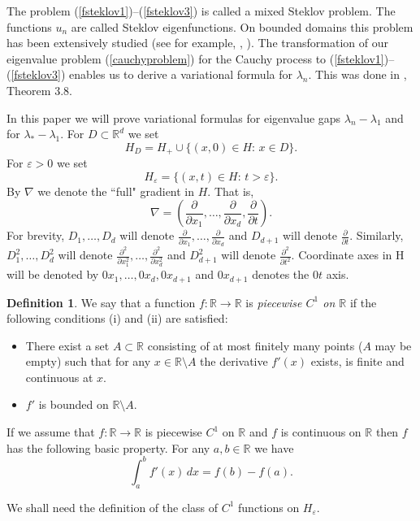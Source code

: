 \documentclass[11pt,leqno]{article}
\theoremstyle{definition}
\newtheorem{defn}{Definition}[section]
\newcommand{\Rd}{\mathbb{R}^d}
\newcommand{\R}{\mathbb{R}}
\newcommand{\eps}{\varepsilon}
\numberwithin{equation}{section}
\begin{document}
The problem (\ref{fsteklov1})--(\ref{fsteklov3}) is called a mixed Steklov problem. The
functions $u_n$ are
called Steklov eigenfunctions. On bounded domains this problem has been 
extensively studied  (see for example,  \cite{HP}, \cite{DS}).
The transformation of our eigenvalue problem (\ref{cauchyproblem}) 
for the Cauchy process to
(\ref{fsteklov1})--(\ref{fsteklov3}) enables us to 
derive a variational formula for
$\lambda_{n}$. This was done in \cite{BK}, Theorem 3.8. 

In this paper we will prove variational formulas for eigenvalue
 gaps $\lambda_n - \lambda_1$
 and for $\lambda_* - \lambda_1$. 
 For $D \subset \Rd$ we set 
$$
H_D = H_+ \cup \{(x,0) \in H: \, x \in D\}.
$$
For $\eps > 0$ we set
$$
H_{\eps} = \{(x,t) \in H: \, t > \eps\}.
$$
By  $\nabla$ we denote the ``full" gradient in $H$.  That is,
$$
\nabla = \left(\frac{\partial}{\partial x_{1}}, \ldots, \frac{\partial}{\partial 
x_{d}}, \frac{\partial}{\partial t} \right).
$$
For brevity, $D_1, \ldots, D_d$ will denote $\frac{\partial}{\partial x_1}, \ldots, \frac{\partial}{\partial x_d}$
and $D_{d+1}$ will denote $\frac{\partial}{\partial t}$. Similarly, $D_1^2, \ldots, D_d^2$ will denote
$\frac{\partial^2}{\partial x_1^2}, \ldots, \frac{\partial^2}{\partial x_d^2}$ and $D_{d+1}^2$ will denote
$\frac{\partial^2}{\partial t^2}$. Coordinate axes in H will be denoted by $0x_1, \ldots, 0x_d, 0x_{d + 1}$ and 
$0x_{d+1}$ denotes the $0t$ axis. 



\begin{defn}
\label{piecewiseR1}
We say that a function $f: \R \to \R$ is {\it piecewise $C^1$ on $\R$} 
if the following conditions (i) and (ii) are satisfied:
\begin{itemize}
\item[(i)] There exist a set $A \subset \R$ consisting of at most finitely many points ($A$ may be empty) such
that for any $x \in \R \setminus A$ the derivative $f'(x)$ exists, is finite and continuous at $x$.

\item[(ii)] $f'$ is bounded on $\R \setminus A$.
\end{itemize}
\end{defn}

If we assume that $f:\R \to \R$ is piecewise $C^1$ on $\R$ and $f$
 is continuous on $\R$ then $f$ has the following basic property. For any $a,b \in \R$ we have
$$
\int_a^b f'(x) \, dx = f(b) - f(a).
$$

We shall need the definition of the class of $C^1$ functions on 
 $H_{\eps}$.
\end{document}
